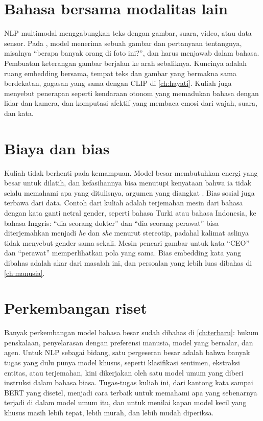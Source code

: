 \section{Bahasa bersama modalitas lain}

NLP multimodal menggabungkan teks dengan gambar, suara, video, atau data sensor. Pada 
\citep{antol2015}, model menerima sebuah gambar dan pertanyaan tentangnya, misalnya ``berapa banyak orang di foto ini?'', dan harus
menjawab dalam bahasa. Pembuatan keterangan gambar berjalan ke arah sebaliknya. Kuncinya adalah ruang embedding bersama, tempat teks
dan gambar yang bermakna sama berdekatan, gagasan yang sama dengan CLIP di \cref{ch:hayati}. Kuliah juga menyebut penerapan seperti
kendaraan otonom yang memadukan bahasa dengan lidar dan kamera, dan komputasi afektif yang membaca emosi dari wajah, suara, dan kata.

\section{Biaya dan bias}

Kuliah tidak berhenti pada kemampuan. Model besar membutuhkan energi yang besar untuk dilatih, dan kefasihannya bisa menutupi
kenyataan bahwa ia tidak selalu memahami apa yang ditulisnya, argumen yang diangkat \citet{bender2021}. Bias sosial juga terbawa
dari data. Contoh dari kuliah adalah terjemahan mesin dari bahasa dengan kata ganti netral gender, seperti bahasa Turki atau bahasa
Indonesia, ke bahasa Inggris: ``dia seorang dokter'' dan ``dia seorang perawat'' bisa diterjemahkan menjadi \emph{he} dan \emph{she}
menurut stereotip, padahal kalimat aslinya tidak menyebut gender sama sekali. Mesin pencari gambar untuk kata ``CEO'' dan
``perawat'' memperlihatkan pola yang sama. Bias embedding kata yang dibahas \citet{bolukbasi2016} adalah akar dari masalah ini,
dan persoalan yang lebih luas dibahas di \cref{ch:manusia}.

\section{Perkembangan riset}

Banyak perkembangan model bahasa besar sudah dibahas di \cref{ch:terbaru}: hukum penskalaan, penyelarasan dengan preferensi manusia,
model yang bernalar, dan agen. Untuk NLP sebagai bidang, satu pergeseran besar adalah bahwa banyak tugas yang dulu punya model
khusus, seperti klasifikasi sentimen, ekstraksi entitas, atau terjemahan, kini dikerjakan oleh satu model umum yang diberi instruksi
dalam bahasa biasa. Tugas-tugas kuliah ini, dari kantong kata sampai BERT yang disetel, menjadi cara terbaik untuk memahami apa yang
sebenarnya terjadi di dalam model umum itu, dan untuk menilai kapan model kecil yang khusus masih lebih tepat, lebih murah, dan lebih
mudah diperiksa.

